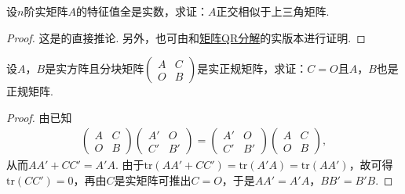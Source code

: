 \documentclass[../../main.tex]{subfiles}%
\begin{document}
\begin{proposition}\label{proposition:两个半正定阵可同时合同对角化8}
设\(n\)阶实矩阵\(A\)的特征值全是实数，求证：\(A\)正交相似于上三角矩阵.
\end{proposition}
\begin{proof}
这是的直接推论. 另外，也可由和\hyperref[theorem:施密特正交化对应的矩阵分解,QR分解]{矩阵QR分解}的实版本进行证明.
\end{proof}

\begin{proposition}\label{proposition:两个半正定阵可同时合同对角化9}
设\(A\)，\(B\)是实方阵且分块矩阵\(\begin{pmatrix}A&C\\O&B\end{pmatrix}\)是实正规矩阵，求证：\(C = O\)且\(A\)，\(B\)也是正规矩阵.
\end{proposition}
\begin{proof}
由已知
\begin{align*}
\begin{pmatrix}A&C\\O&B\end{pmatrix}\begin{pmatrix}A'&O\\C'&B'\end{pmatrix}=\begin{pmatrix}A'&O\\C'&B'\end{pmatrix}\begin{pmatrix}A&C\\O&B\end{pmatrix},
\end{align*}
从而\(AA'+CC' = A'A\). 由于\(\mathrm{tr}(AA'+CC')=\mathrm{tr}(A'A)=\mathrm{tr}(AA')\)，故可得\(\mathrm{tr}(CC') = 0\)，再由\(C\)是实矩阵可推出\(C = O\)，于是\(AA' = A'A\)，\(BB' = B'B\).
\end{proof}
\end{document}
